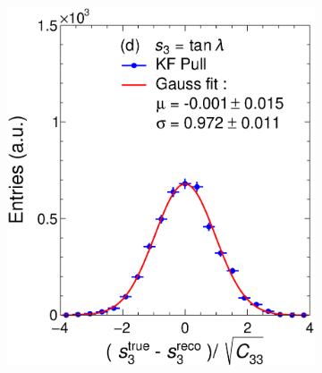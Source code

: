 \begin{figure}[t]
\begin{subfigure}{0.32\textwidth}
         \caption{}
         \label{fig:resp2KF_GArLite_Corr}
     \end{subfigure}
          \begin{subfigure}{0.32\textwidth}
         \centering
         \includegraphics[width=\textwidth]{figures/ch4-KF_NDGArLite/Toy/Corr/UnitKFEnd_p3.eps}
         \caption{}
         \label{fig:resp3KF_GArLite_Corr}
     \end{subfigure}
     \begin{subfigure}{0.32\textwidth}
         \centering

\end{subfigure}
\end{figure}
